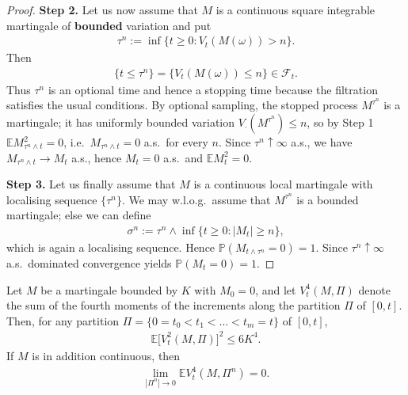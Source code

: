 \begin{proof}
	\textbf{Step 2.} Let us now assume that $M$ is a continuous square integrable martingale of \textbf{bounded} variation and put
	\begin{align*}
		\tau^n := \inf\{t \ge 0 : V_t(M(\omega)) > n\}.
	\end{align*}
	Then
	\begin{align*}
		\{t \le \tau^n\} = \{V_t(M(\omega)) \le n\} \in \mathcal{F}_t.
	\end{align*}
	Thus $\tau^n$ is an optional time and hence a stopping time because the filtration satisfies the usual conditions. By optional sampling, the stopped process $M^{\tau^n}$ is a martingale; it has uniformly bounded variation $V_\cdot(M^{\tau^n}) \le n$, so by Step 1 $\mathbb{E} M^2_{\tau^n \wedge t} = 0$, i.e.\ $M_{\tau^n \wedge t} = 0$ a.s.\ for every $n$. Since $\tau^n \uparrow \infty$ a.s., we have $M_{\tau^n \wedge t} \to M_t$ a.s., hence $M_t = 0$ a.s.\ and $\mathbb{E} M_t^2 = 0$.

	\textbf{Step 3.} Let us finally assume that $M$ is a continuous local martingale with localising sequence $\{\tau^n\}$. We may w.l.o.g.\ assume that $M^{\tau^n}$ is a bounded martingale; else we can define
	\begin{align*}
		\sigma^n := \tau^n \wedge \inf\{t \ge 0 : |M_t| \ge n\},
	\end{align*}
	which is again a localising sequence. Hence $\mathbb{P}(M_{t \wedge \tau^n} = 0) = 1$. Since $\tau^n \uparrow \infty$ a.s.\ dominated convergence yields $\mathbb{P}(M_t = 0) = 1$.
\end{proof}



\begin{lemma}
	Let $M$ be a martingale bounded by $K$ with $M_0 = 0$, and let $V_t^4(M, \Pi)$ denote the sum of the fourth moments of the increments along the partition $\Pi$ of $[0, t]$. Then, for any partition $\Pi = \{0 = t_0 < t_1 < \dots < t_m = t\}$ of $[0, t]$,
	\begin{align*}
		\mathbb{E}\big[ V_t^2(M, \Pi) \big]^2 \le 6 K^4.
	\end{align*}
	If $M$ is in addition continuous, then
	\begin{align*}
		\lim_{|\Pi^n| \rightarrow 0} \mathbb{E} V_t^4(M, \Pi^n) = 0.
	\end{align*}
\end{lemma}

